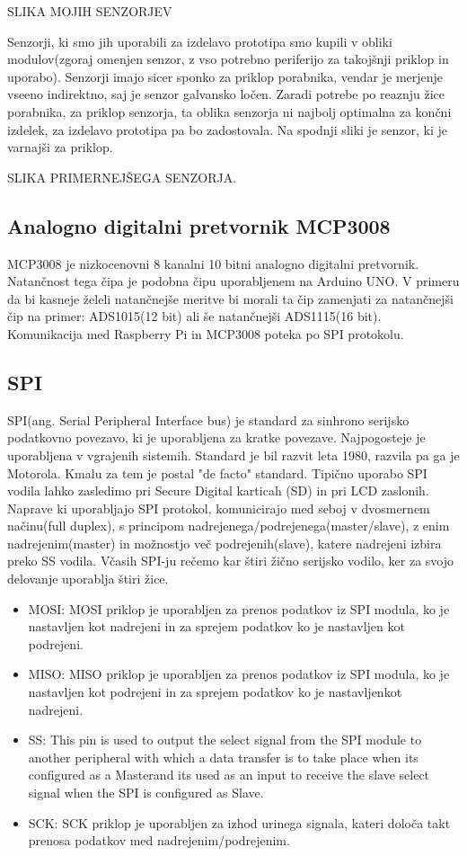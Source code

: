 \documentclass[12pt,a4paper,titlepage,openany]{report}
\begin{document}
SLIKA MOJIH SENZORJEV

Senzorji, ki smo jih uporabili za izdelavo prototipa smo kupili v obliki modulov(zgoraj omenjen senzor, z vso potrebno periferijo za takojšnji priklop in uporabo). Senzorji imajo sicer sponko za priklop porabnika, vendar je merjenje vseeno indirektno, saj je senzor galvansko ločen. Zaradi potrebe po reaznju žice porabnika, za priklop senzorja, ta oblika senzorja ni najbolj optimalna za končni izdelek, za izdelavo prototipa pa bo zadostovala. Na spodnji sliki je senzor, ki je varnajši za priklop.

SLIKA PRIMERNEJŠEGA SENZORJA.

\subsection{Analogno digitalni pretvornik MCP3008}
MCP3008 je nizkocenovni 8 kanalni 10 bitni analogno digitalni pretvornik. Natančnost tega čipa je podobna čipu uporabljenem na Arduino UNO. V primeru da bi kasneje želeli natančnejše meritve bi morali ta čip zamenjati za natančnejši čip na primer: ADS1015(12 bit) ali še natančnejši ADS1115(16 bit). Komunikacija med Raspberry Pi in MCP3008 poteka po SPI protokolu.

\subsection{SPI}
SPI(ang. Serial Peripheral Interface bus) je standard za sinhrono serijsko podatkovno povezavo, ki je uporabljena za kratke povezave. Najpogosteje je uporabljena v vgrajenih sistemih. Standard je bil razvit leta 1980, razvila pa ga je Motorola. Kmalu za tem je postal "de facto" standard. Tipično uporabo SPI vodila lahko zasledimo pri Secure Digital karticah (SD) in pri LCD zaslonih. Naprave ki uporabljajo SPI protokol, komunicirajo med seboj v dvosmernem načinu(full duplex), s principom nadrejenega/podrejenega(master/slave), z enim nadrejenim(master) in možnostjo več podrejenih(slave), katere nadrejeni izbira preko SS vodila. Včasih SPI-ju rečemo kar štiri žično serijsko vodilo, ker za svojo delovanje uporablja štiri žice.

\begin{itemize}
\item MOSI: MOSI priklop je uporabljen za prenos podatkov iz SPI modula, ko je nastavljen kot nadrejeni in za sprejem podatkov ko je nastavljen kot podrejeni.
\item MISO: MISO priklop je uporabljen za prenos podatkov iz SPI modula, ko je nastavljen kot podrejeni in za sprejem podatkov ko je nastavljenkot nadrejeni.
\item SS: This pin is used to output the select signal from the SPI module to another peripheral with which a data transfer is to take place when its configured as a Masterand its used as an input to receive the slave select signal when the SPI is configured as Slave.
\item SCK: SCK priklop je uporabljen za izhod urinega signala, kateri določa takt prenosa podatkov med nadrejenim/podrejenim.
\end{itemize}
\end{document}
